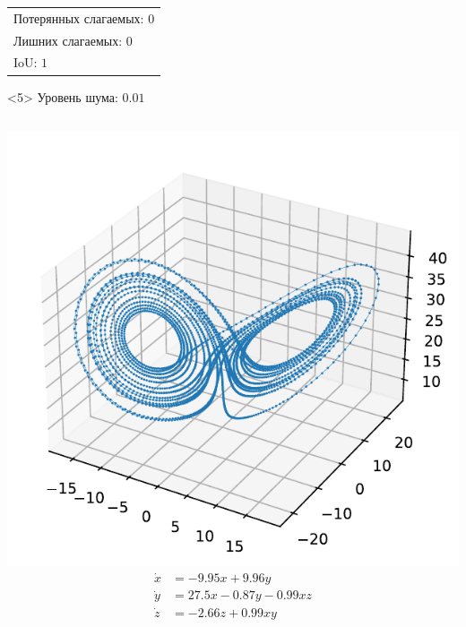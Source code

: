 \documentclass[pdf, hyperref={unicode}, aspectratio=169]{beamer}
\begin{document}
\begin{frame}
\begin{onlyenv}
\begin{columns}
\end{columns}
\vfill
\begin{center}
  \begin{tabular}{l}
  Потерянных слагаемых: $0$\\
  Лишних слагаемых: $0$\\
  IoU: $1$\\
  \end{tabular}
\end{center}
\end{onlyenv}

\begin{onlyenv}<5>
Уровень шума: $0.01$
\vfill
\begin{columns}
  \includegraphics[height=\linewidth]{img/ex2_orig}
  \begin{align*}
  \dot{x} &= -9.95 x + 9.96 y \\
  \dot{y} &= 27.5 x - 0.87 y - 0.99 x z \\
  \dot{z} &= -2.66 z + 0.99 x y
  \end{align*}

\end{columns}
\end{onlyenv}
\end{frame}
\end{document}
